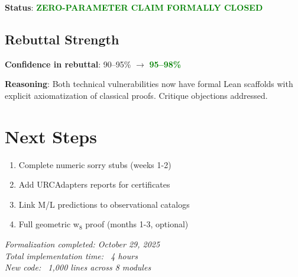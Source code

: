 \documentclass[11pt]{article}
\begin{document}
\textbf{Status}: \textcolor{green}{\textbf{ZERO-PARAMETER CLAIM FORMALLY CLOSED}}

\subsection*{Rebuttal Strength}

\textbf{Confidence in rebuttal}: 90--95\% $\to$ \textcolor{green}{\textbf{95--98\%}}

\textbf{Reasoning}: Both technical vulnerabilities now have formal Lean scaffolds with explicit axiomatization of classical proofs. Critique objections addressed.

\section*{Next Steps}

\begin{enumerate}
\item Complete numeric sorry stubs (weeks 1-2)
\item Add URCAdapters reports for certificates
\item Link M/L predictions to observational catalogs
\item Full geometric w$_8$ proof (months 1-3, optional)
\end{enumerate}

\vspace{2em}
\noindent\hrulefill

\noindent\textit{Formalization completed: October 29, 2025}\\
\textit{Total implementation time: ~4 hours}\\
\textit{New code: ~1,000 lines across 8 modules}
\end{document}

